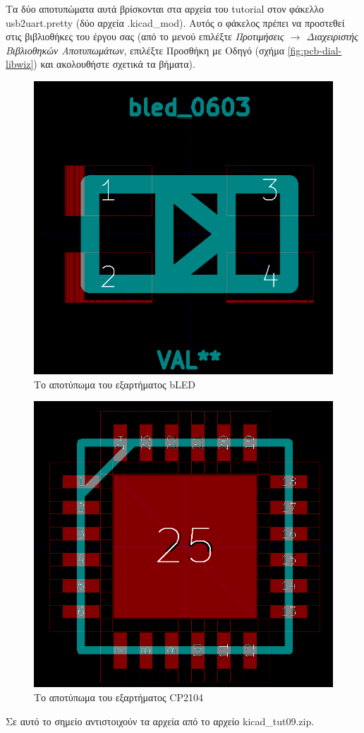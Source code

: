 \documentclass[a4paper]{article}
\begin{document}
Τα δύο αποτυπώματα αυτά βρίσκονται στα αρχεία του tutorial στον φάκελλο usb2uart.pretty (δύο αρχεία .kicad\_mod). Αυτός ο φάκελος πρέπει να προστεθεί στις βιβλιοθήκες του έργου σας (από το μενού επιλέξτε \textit{Προτιμήσεις $\rightarrow$ Διαχειριστής Βιβλιοθηκών Αποτυπωμάτων}, επιλέξτε Προσθήκη με Οδηγό (σχήμα \ref{fig:pcb-dial-libwiz}) και ακολουθήστε σχετικά τα βήματα).

\begin{figure}
  \begin{center}
    \includegraphics[width=.5\textwidth]{img/footed-circ-bled.png}
    \caption{Το αποτύπωμα του εξαρτήματος bLED}
    \label{fig:footed-circ-bled}
  \end{center}
\end{figure}

\begin{figure}
  \begin{center}
    \includegraphics[width=.5\textwidth]{img/footed-circ-cp}
    \caption{Το αποτύπωμα του εξαρτήματος CP2104}
    \label{fig:footed-circ-cp}
  \end{center}
\end{figure}

Σε αυτό το σημείο αντιστοιχούν τα αρχεία από το αρχείο kicad\_tut09.zip.
\end{document}
